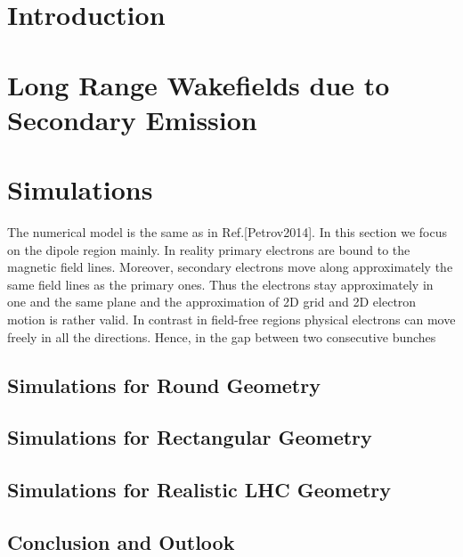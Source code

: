 \documentclass[5p]{elsarticle}%
\begin{document}
\section{Introduction}

\section{Long Range Wakefields due to Secondary Emission}

\section{Simulations}
	The numerical model is the same as in Ref.[Petrov2014].
	In this section we focus on the dipole region mainly. 
	In reality primary electrons are bound to the magnetic field lines.
	Moreover, secondary electrons move along approximately the same field lines as the primary ones.
	Thus the electrons stay approximately in one and the same plane and the approximation of 2D grid and 2D electron motion is rather valid.
	In contrast in field-free regions physical electrons can move freely in all the directions.
	Hence, in the gap between two consecutive bunches

\subsection{Simulations for Round Geometry}

\subsection{Simulations for Rectangular Geometry}

\subsection{Simulations for Realistic LHC Geometry}

\subsection{Conclusion and Outlook}

\begin{thebibliography}{16}%


\end{thebibliography}%
\end{document}
